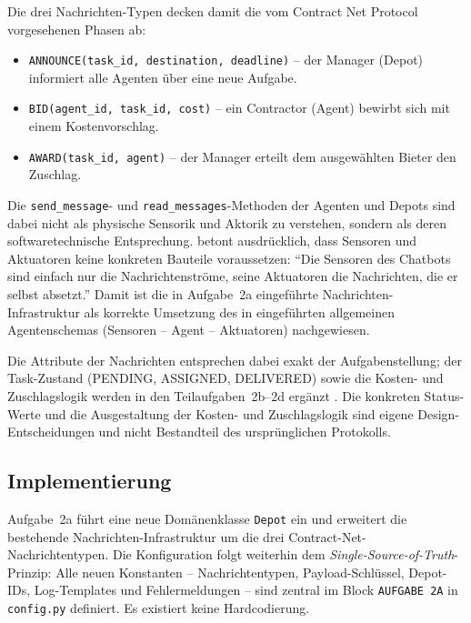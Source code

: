 Die drei Nachrichten-Typen decken damit die vom Contract Net Protocol vorgesehenen Phasen ab: 
\begin{itemize}
    \item \texttt{ANNOUNCE(task\_id, destination, deadline)} -- der Manager (Depot) informiert alle Agenten über eine neue Aufgabe.
    \item \texttt{BID(agent\_id, task\_id, cost)} -- ein Contractor (Agent) bewirbt sich mit einem Kostenvorschlag.
    \item \texttt{AWARD(task\_id, agent)} -- der Manager erteilt dem ausgewählten Bieter den Zuschlag.
\end{itemize}

Die \texttt{send\_message}- und \texttt{read\_messages}-Methoden der Agenten und Depots sind dabei nicht als physische Sensorik und Aktorik zu verstehen, sondern als deren softwaretechnische Entsprechung. \textcite[S. 8\,f.]{5} betont ausdrücklich, dass Sensoren und Aktuatoren keine konkreten Bauteile voraussetzen: \enquote{Die Sensoren des Chatbots sind einfach nur die Nachrichtenströme, seine Aktuatoren die Nachrichten, die er selbst absetzt.} Damit ist die in Aufgabe~2a eingeführte Nachrichten-Infrastruktur als korrekte Umsetzung des in \textcite[S. 8]{5} eingeführten allgemeinen Agentenschemas (Sensoren -- Agent -- Aktuatoren) nachgewiesen.

Die Attribute der Nachrichten entsprechen dabei exakt der Aufgabenstellung; der Task-Zustand (PENDING, ASSIGNED, DELIVERED) sowie die Kosten- und Zuschlagslogik werden in den Teilaufgaben~2b--2d ergänzt \cite[S. 30\,ff.]{5}. Die konkreten Status-Werte und die Ausgestaltung der Kosten- und Zuschlagslogik sind eigene Design-Entscheidungen und nicht Bestandteil des ursprünglichen Protokolls.

\subsection{Implementierung}

Aufgabe~2a führt eine neue Domänenklasse \texttt{Depot} ein und erweitert die bestehende Nachrichten-Infrastruktur um die drei Contract-Net-Nachrichtentypen. Die Konfiguration folgt weiterhin dem \textit{Single-Source-of-Truth}-Prinzip: Alle neuen Konstanten -- Nachrichtentypen, Payload-Schlüssel, Depot-IDs, Log-Templates und Fehlermeldungen -- sind zentral im Block \texttt{AUFGABE 2A} in \texttt{config.py} definiert. Es existiert keine Hardcodierung.


